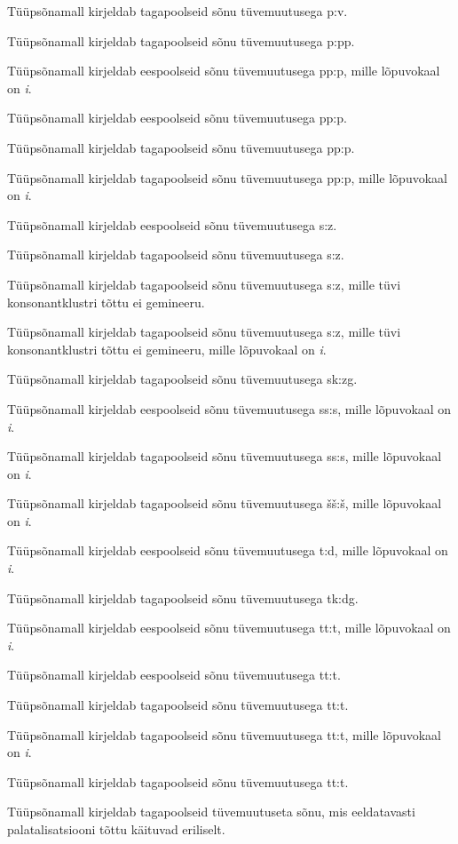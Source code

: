 \documentclass[12pt,a4paper]{article}
\begin{document}

Tüüpsõna\-mall kirjeldab tagapoolseid sõnu tüvemuutusega p:v.

Tüüpsõna\-mall kirjeldab tagapoolseid sõnu tüvemuutusega p:pp.

Tüüpsõna\-mall kirjeldab eespoolseid sõnu tüvemuutusega pp:p, mille lõpuvokaal on \textit{i}.%

Tüüpsõna\-mall kirjeldab eespoolseid sõnu tüvemuutusega pp:p.

Tüüpsõna\-mall kirjeldab tagapoolseid sõnu tüvemuutusega pp:p.

Tüüpsõna\-mall kirjeldab tagapoolseid sõnu tüvemuutusega pp:p, mille lõpuvokaal on \textit{i}.%

Tüüpsõna\-mall kirjeldab eespoolseid sõnu tüvemuutusega s:z.

Tüüpsõna\-mall kirjeldab tagapoolseid sõnu tüvemuutusega s:z.

Tüüpsõna\-mall kirjeldab tagapoolseid sõnu tüvemuutusega s:z, mille tüvi konsonant\-klustri tõttu ei gemineeru.

Tüüpsõna\-mall kirjeldab tagapoolseid sõnu tüvemuutusega s:z, mille tüvi konsonant\-klustri tõttu ei gemineeru, mille lõpuvokaal on \textit{i}. %

Tüüpsõna\-mall kirjeldab tagapoolseid sõnu tüvemuutusega sk:zg.

Tüüpsõna\-mall kirjeldab eespoolseid sõnu tüvemuutusega ss:s, mille lõpuvokaal on \textit{i}. %

Tüüpsõna\-mall kirjeldab tagapoolseid sõnu tüvemuutusega ss:s, mille lõpuvokaal on \textit{i}. %

Tüüpsõna\-mall kirjeldab tagapoolseid sõnu tüvemuutusega šš:š, mille lõpuvokaal on \textit{i}. %

Tüüpsõna\-mall kirjeldab eespoolseid sõnu tüvemuutusega t:d, mille lõpuvokaal on \textit{i}. %

Tüüpsõna\-mall kirjeldab tagapoolseid sõnu tüvemuutusega tk:dg.

Tüüpsõna\-mall kirjeldab eespoolseid sõnu tüvemuutusega tt:t, mille lõpuvokaal on \textit{i}. %

Tüüpsõna\-mall kirjeldab eespoolseid sõnu tüvemuutusega tt:t.

Tüüpsõna\-mall kirjeldab tagapoolseid sõnu tüvemuutusega tt:t.

Tüüpsõna\-mall kirjeldab tagapoolseid sõnu tüvemuutusega tt:t, mille lõpuvokaal on \textit{i}.  %

Tüüpsõna\-mall kirjeldab tagapoolseid sõnu tüvemuutusega tt:t.
%

Tüüpsõna\-mall kirjeldab tagapoolseid tüvemuutuseta sõnu, mis eeldatavasti palatalisatsiooni tõttu käituvad eriliselt.
\end{document}
